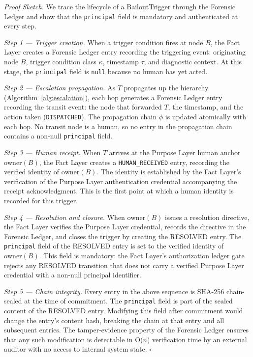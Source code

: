 \bigskip

\noindent\textit{Proof Sketch.} We trace the lifecycle of a BailoutTrigger through the Forensic Ledger and show that the \texttt{principal} field is mandatory and authenticated at every step.

\medskip

\noindent\textit{Step 1 — Trigger creation.}
When a trigger condition fires at node $B$, the Fact Layer creates a Forensic Ledger entry recording the triggering event: originating node $B$, trigger condition class $\kappa$, timestamp $\tau$, and diagnostic context. At this stage, the \texttt{principal} field is \texttt{null} because no human has yet acted.

\medskip

\noindent\textit{Step 2 — Escalation propagation.}
As $T$ propagates up the hierarchy (Algorithm~\ref{alg:escalation}), each hop generates a Forensic Ledger entry recording the transit event: the node that forwarded $T$, the timestamp, and the action taken (\texttt{DISPATCHED}). The propagation chain $\phi$ is updated atomically with each hop. No transit node is a human, so no entry in the propagation chain contains a non-null \texttt{principal} field.

\medskip

\noindent\textit{Step 3 — Human receipt.}
When $T$ arrives at the Purpose Layer human anchor $\text{owner}(B)$, the Fact Layer creates a \texttt{HUMAN\_RECEIVED} entry, recording the verified identity of $\text{owner}(B)$. The identity is established by the Fact Layer's verification of the Purpose Layer authentication credential accompanying the receipt acknowledgment. This is the first point at which a human identity is recorded for this trigger.

\medskip

\noindent\textit{Step 4 — Resolution and closure.}
When $\text{owner}(B)$ issues a resolution directive, the Fact Layer verifies the Purpose Layer credential, records the directive in the Forensic Ledger, and closes the trigger by creating the RESOLVED entry. The \texttt{principal} field of the RESOLVED entry is set to the verified identity of $\text{owner}(B)$. This field is mandatory: the Fact Layer's authorization ledger gate rejects any RESOLVED transition that does not carry a verified Purpose Layer credential with a non-null principal identifier.

\medskip

\noindent\textit{Step 5 — Chain integrity.}
Every entry in the above sequence is SHA-256 chain-sealed at the time of commitment. The \texttt{principal} field is part of the sealed content of the RESOLVED entry. Modifying this field after commitment would change the entry's content hash, breaking the chain at that entry and all subsequent entries. The tamper-evidence property of the Forensic Ledger ensures that any such modification is detectable in O($n$) verification time by an external auditor with no access to internal system state. $\square$

